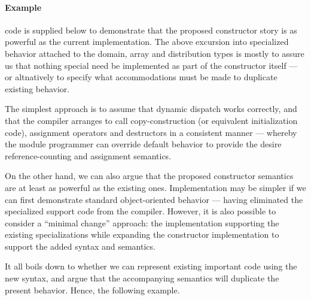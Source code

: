 \paragraph{Example}
code is supplied below to demonstrate that the proposed constructor story is as
powerful as the current implementation.  The above excursion into specialized
behavior attached to the domain, array and distribution types is mostly to
assure us that nothing special need be implemented as part of the constructor
itself --- or altnatively to specify what accommodations must be made to
duplicate existing behavior.  

The simplest approach is to assume that dynamic dispatch works correctly, and
that the compiler arranges to call copy-construction (or equivalent
initialization code), assignment operators and destructors in a consistent
manner --- whereby the module programmer can override default behavior to
provide the desire reference-counting and assignment semantics.

On the other hand, we can also argue that the proposed constructor semantics are
at least as powerful as the existing ones.  Implementation may be simpler if we
can first demonstrate standard object-oriented behavior --- having eliminated
the specialized support code from the compiler.  However, it is also possible to
consider a ``minimal change'' approach: the implementation supporting the
existing specializations while expanding the constructor implementation to
support the added syntax and semantics.

It all boils down to whether we can represent existing important code using the
new syntax, and argue that the accompanying semantics will duplicate the present
behavior.  Hence, the following example.

